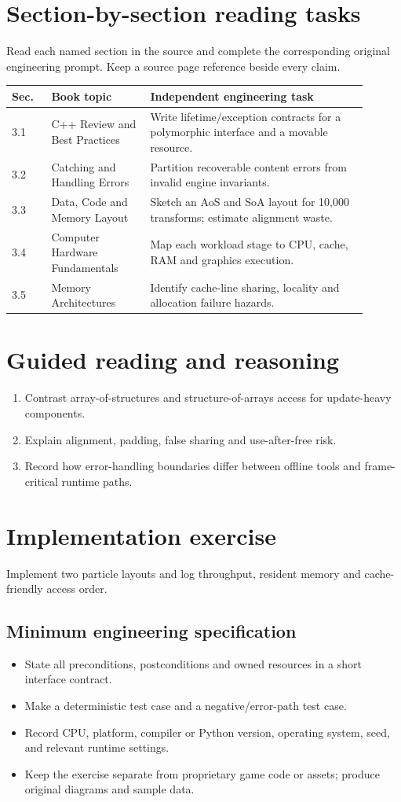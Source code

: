 \documentclass[11pt,letterpaper]{article}
\begin{document}
\section{Section-by-section reading tasks}
Read each named section in the source and complete the corresponding original engineering prompt. Keep a source page reference beside every claim.
\small\begin{longtable}{|p{0.10\linewidth}|p{0.25\linewidth}|p{0.55\linewidth}|}
\hline \textbf{Sec.} & \textbf{Book topic} & \textbf{Independent engineering task} \\ \hline\endhead
3.1 & C++ Review and Best Practices & Write lifetime/exception contracts for a polymorphic interface and a movable resource. \\ \hline
3.2 & Catching and Handling Errors & Partition recoverable content errors from invalid engine invariants. \\ \hline
3.3 & Data, Code and Memory Layout & Sketch an AoS and SoA layout for 10,000 transforms; estimate alignment waste. \\ \hline
3.4 & Computer Hardware Fundamentals & Map each workload stage to CPU, cache, RAM and graphics execution. \\ \hline
3.5 & Memory Architectures & Identify cache-line sharing, locality and allocation failure hazards. \\ \hline
\end{longtable}\normalsize
\section{Guided reading and reasoning}
\begin{enumerate}
\item Contrast array-of-structures and structure-of-arrays access for update-heavy components.
\item Explain alignment, padding, false sharing and use-after-free risk.
\item Record how error-handling boundaries differ between offline tools and frame-critical runtime paths.
\end{enumerate}
\section{Implementation exercise}
Implement two particle layouts and log throughput, resident memory and cache-friendly access order.

\subsection{Minimum engineering specification}
\begin{itemize}
\item State all preconditions, postconditions and owned resources in a short interface contract.
\item Make a deterministic test case and a negative/error-path test case.
\item Record CPU, platform, compiler or Python version, operating system, seed, and relevant runtime settings.
\item Keep the exercise separate from proprietary game code or assets; produce original diagrams and sample data.
\end{itemize}
\end{document}
